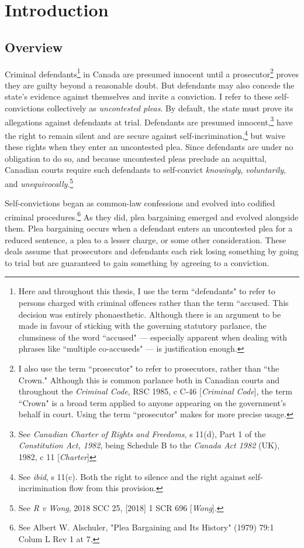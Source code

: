 \chapter{Introduction}

\section{Overview}

Criminal defendants\footnote{Here and throughout this thesis, I use the term ``defendants" to refer to persons charged with criminal offences rather than the term ``accused. This decision was entirely phonaesthetic. Although there is an argument to be made in favour of sticking with the governing statutory parlance, the clumsiness of the word ``accused" — especially apparent when dealing with phrases like ``multiple co-accuseds" — is justification enough.} in Canada are presumed innocent until a prosecutor\footnote{I also use the term ``prosecutor" to refer to prosecutors, rather than ``the Crown." Although this is common parlance both in Canadian courts and throughout the \textit{Criminal Code}, RSC 1985, c C-46 [\textit{Criminal Code}], the term ``Crown" is a broad term applied to anyone appearing on the government's behalf in court. Using the term ``prosecutor" makes for more precise usage.} proves they are guilty beyond a reasonable doubt. But defendants may also concede the state's evidence against themselves and invite a conviction. I refer to these self-convictions collectively as \textit{uncontested pleas}. By default, the state must prove its allegations against defendants at trial. Defendants are presumed innocent,\footnote{See \textit{Canadian Charter of Rights and Freedoms}, s 11(d), Part 1 of the \textit{Constitution Act, 1982}, being Schedule B to the \textit{Canada Act 1982} (UK), 1982, c 11 [\textit{Charter}]} have the right to remain silent and are secure against self-incrimination,\footnote{See \textit{ibid}, s 11(c). Both the right to silence and the right against self-incrimination flow from this provision.} but waive these rights when they enter an uncontested plea. Since defendants are under no obligation to do so, and because uncontested pleas preclude an acquittal, Canadian courts require such defendants to self-convict \textit{knowingly}, \textit{voluntarily}, and \textit{unequivocally}.\footnote{See \textit{R v Wong}, 2018 SCC 25, [2018] 1 SCR 696 [\textit{Wong}].}

Self-convictions began as common-law confessions and evolved into codified criminal procedures.\footnote{See Albert W. Alschuler, "Plea Bargaining and Its History" (1979) 79:1 Colum L Rev 1 at 7.} As they did, plea bargaining emerged and evolved alongside them. Plea bargaining occurs when a defendant enters an uncontested plea for a reduced sentence, a plea to a lesser charge, or some other consideration. These deals assume that prosecutors and defendants each risk losing something by going to trial but are guaranteed to gain something by agreeing to a conviction.

